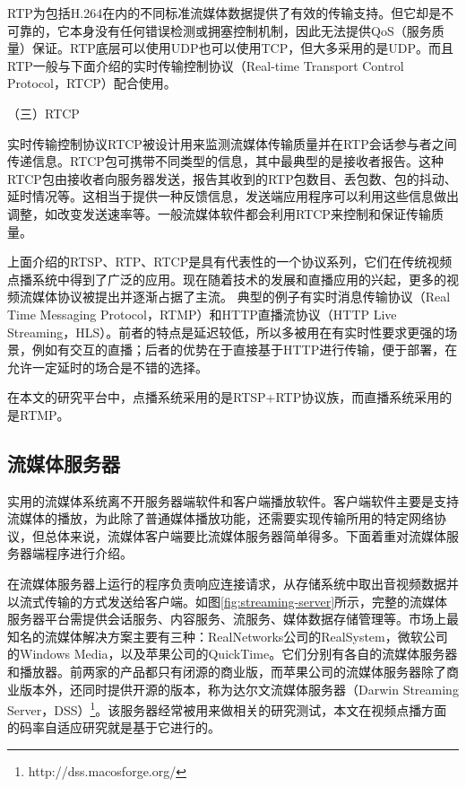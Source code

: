 RTP为包括H.264在内的不同标准流媒体数据提供了有效的传输支持。但它却是不可靠的，它本身没有任何错误检测或拥塞控制机制，因此无法提供QoS（服务质量）保证。RTP底层可以使用UDP也可以使用TCP，但大多采用的是UDP。而且RTP一般与下面介绍的实时传输控制协议（Real-time Transport Control Protocol，RTCP）配合使用。

（三）RTCP

实时传输控制协议RTCP被设计用来监测流媒体传输质量并在RTP会话参与者之间传递信息。RTCP包可携带不同类型的信息，其中最典型的是接收者报告。这种RTCP包由接收者向服务器发送，报告其收到的RTP包数目、丢包数、包的抖动、延时情况等。这相当于提供一种反馈信息，发送端应用程序可以利用这些信息做出调整，如改变发送速率等。一般流媒体软件都会利用RTCP来控制和保证传输质量。

上面介绍的RTSP、RTP、RTCP是具有代表性的一个协议系列，它们在传统视频点播系统中得到了广泛的应用。现在随着技术的发展和直播应用的兴起，更多的视频流媒体协议被提出并逐渐占据了主流。
典型的例子有实时消息传输协议（Real Time Messaging Protocol，RTMP）\supercite{RTMP}和HTTP直播流协议（HTTP Live Streaming，HLS）\supercite{HLS}。前者的特点是延迟较低，所以多被用在有实时性要求更强的场景，例如有交互的直播；后者的优势在于直接基于HTTP进行传输，便于部署，在允许一定延时的场合是不错的选择。

在本文的研究平台中，点播系统采用的是RTSP+RTP协议族，而直播系统采用的是RTMP。

\subsection{流媒体服务器}

实用的流媒体系统离不开服务器端软件和客户端播放软件。客户端软件主要是支持流媒体的播放，为此除了普通媒体播放功能，还需要实现传输所用的特定网络协议，但总体来说，流媒体客户端要比流媒体服务器简单得多。下面着重对流媒体服务器端程序进行介绍。

在流媒体服务器上运行的程序负责响应连接请求，从存储系统中取出音视频数据并以流式传输的方式发送给客户端。如图\ref{fig:streaming-server}所示，完整的流媒体服务器平台需提供会话服务、内容服务、流服务、媒体数据存储管理等。市场上最知名的流媒体解决方案主要有三种：RealNetworks公司的RealSystem，微软公司的Windows Media，以及苹果公司的QuickTime。它们分别有各自的流媒体服务器和播放器。前两家的产品都只有闭源的商业版，而苹果公司的流媒体服务器除了商业版本外，还同时提供开源的版本，称为达尔文流媒体服务器（Darwin Streaming Server，DSS）\footnote{http://dss.macosforge.org/}。该服务器经常被用来做相关的研究测试\supercite{Huang2004}，本文在视频点播方面的码率自适应研究就是基于它进行的。

